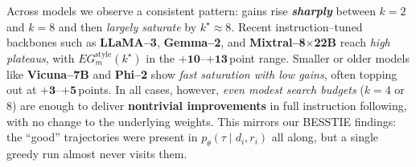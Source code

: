 Across models we observe a consistent pattern: gains rise
\emph{\textbf{sharply}} between $k{=}2$ and $k{=}8$ and then
\emph{largely saturate} by $k^\star{\approx}8$.
Recent instruction--tuned backbones such as \textbf{LLaMA--3},
\textbf{Gemma--2}, and \textbf{Mixtral--8$\times$22B} reach
\emph{high plateaus}, with $EG^{\text{style}}_m(k^\star)$ in the
$\mathbf{+10}$--$\mathbf{+13}$\,point range.  Smaller or older models
like \textbf{Vicuna--7B} and \textbf{Phi--2} show
\emph{fast saturation with low gains}, often topping out at
$\mathbf{+3}$--$\mathbf{+5}$\,points.  In all cases, however,
\emph{even modest search budgets} ($k{=}4$ or $8$) are enough to deliver
\textbf{nontrivial improvements} in full instruction following, with no
change to the underlying weights.  This mirrors our BESSTIE findings:
the ``good'' trajectories were present in $p_\theta(\tau\mid d_i,r_i)$
all along, but a single greedy run almost never visits them.



